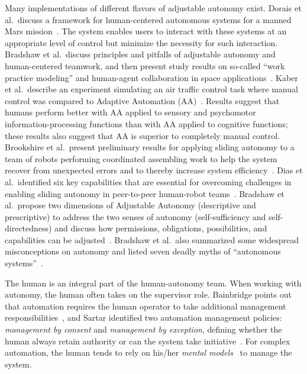 Many implementations of different flavors of adjustable autonomy exist. Dorais et al.\ discuss a framework for human-centered autonomous systems for a manned Mars mission~\cite{Dorais1998AdjustableAutonomy}. The system enables users to interact with these systems at an appropriate level of control but minimize the necessity for such interaction. Bradshaw et al.\ discuss principles and pitfalls of adjustable autonomy and human-centered teamwork, and then present study results on so-called ``work practice modeling'' and human-agent collaboration in space applications~\cite{Bradshaw2003AdjustableAutonomy}. Kaber et al.\ describe an experiment simulating an air traffic control task where manual control was compared to Adaptive Automation (AA)~\cite{Kaber2005Adaptive}. Results suggest that humans perform better with AA applied to sensory and psychomotor information-processing functions than with AA applied to cognitive functions; these results also suggest that AA is superior to completely manual control. Brookshire et al.\ present preliminary results for applying sliding autonomy to a team of robots performing coordinated assembling work to help the system recover from unexpected errors and to thereby increase system efficiency~\cite{Brookshire2004Preliminary}. Dias et al.\ identified six key capabilities that are essential for overcoming challenges in enabling sliding autonomy in peer-to-peer human-robot teams~\cite{Dias2008SlidingAutonomy}. Bradshaw et al.\ propose two dimensions of Adjustable Autonomy (descriptive and prescriptive) to address the two senses of autonomy (self-sufficiency and self-directedness) and discuss how permissions, obligations, possibilities, and capabilities can be adjusted~\cite{Bradshaw2004Dimensions}. Bradshaw et al.\ also summarized some widespread misconceptions on autonomy and listed seven deadly myths of ``autonomous systems''~\cite{Bradshaw2013Seven}.

The human is an integral part of the human-autonomy team. When working with autonomy, the human often takes on the supervisor role. Bainbridge points out that automation requires the human operator to take additional management responsibilities~\cite{Bainbridge1983Ironies}, and Sartar identified two automation management policies: \textit{management by consent} and \textit{management by exception}, defining whether the human always retain authority or can the system take initiative~\cite{Sarter1998Making}. For complex automation, the human tends to rely on his/her \textit{mental models}~\cite{Norman1983Some} to manage the system. 

